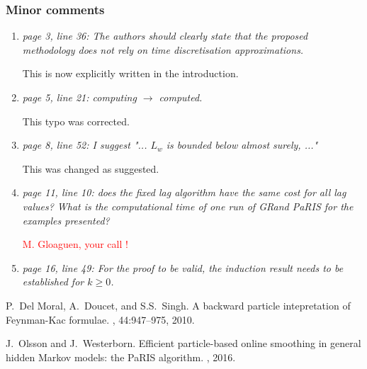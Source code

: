 \documentclass[12pt]{article}
\newcommand{\1}{\mathrm{1}}
\begin{document}
\subsubsection*{Minor comments}
\begin{enumerate}
\item{\em page 3, line 36: The authors should clearly state that the proposed methodology
does not rely on time discretisation approximations.}

\vspace{.3cm}

This is now explicitly written in the introduction.

\item{\em page 5, line 21: computing $\longrightarrow$ computed.}

\vspace{.3cm}

This typo was corrected.

\item {\em page 8, line 52: I suggest "... $L_w$ is bounded below almost surely, ..."}

\vspace{.3cm}

This was changed as suggested.

\item {\em page 11, line 10: does the fixed lag algorithm have the same cost for all lag values?
What is the computational time of one run of GRand PaRIS for the examples presented?}

\vspace{.3cm}

\textcolor{red}{M. Gloaguen, your call !}

\item {\em page 16, line 49: For the proof to be valid, the induction result needs to be established for $k\ge 0$.}

\vspace{.3cm}

\end{enumerate}


\begin{thebibliography}{10}

P.~{D}el {M}oral, {A}.~{D}oucet, and {S}.{S}.~{S}ingh.
\newblock A backward particle intepretation of {F}eynman-{K}ac formulae.
, 44:947--975, 2010.

J.~Olsson and J.~Westerborn.
\newblock Efficient particle-based online smoothing in general hidden {M}arkov
  models: the {PaRIS} algorithm.
, 2016.


\end{thebibliography}
\end{document}
